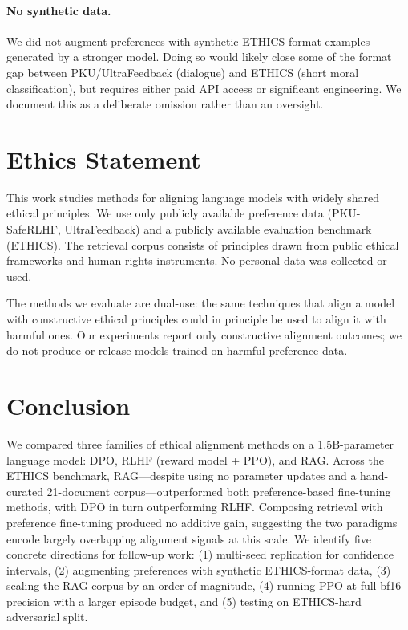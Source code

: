 \paragraph{No synthetic data.} We did not augment preferences with synthetic ETHICS-format examples generated by a stronger model. Doing so would likely close some of the format gap between PKU/UltraFeedback (dialogue) and ETHICS (short moral classification), but requires either paid API access or significant engineering. We document this as a deliberate omission rather than an oversight.

\section{Ethics Statement}
This work studies methods for aligning language models with widely shared ethical principles. We use only publicly available preference data (PKU-SafeRLHF, UltraFeedback) and a publicly available evaluation benchmark (ETHICS). The retrieval corpus consists of principles drawn from public ethical frameworks and human rights instruments. No personal data was collected or used.

The methods we evaluate are dual-use: the same techniques that align a model with constructive ethical principles could in principle be used to align it with harmful ones. Our experiments report only constructive alignment outcomes; we do not produce or release models trained on harmful preference data.

\section{Conclusion}

We compared three families of ethical alignment methods on a 1.5B-parameter language model: DPO, RLHF (reward model + PPO), and RAG. Across the ETHICS benchmark, RAG—despite using no parameter updates and a hand-curated 21-document corpus—outperformed both preference-based fine-tuning methods, with DPO in turn outperforming RLHF. Composing retrieval with preference fine-tuning produced no additive gain, suggesting the two paradigms encode largely overlapping alignment signals at this scale. We identify five concrete directions for follow-up work: (1) multi-seed replication for confidence intervals, (2) augmenting preferences with synthetic ETHICS-format data, (3) scaling the RAG corpus by an order of magnitude, (4) running PPO at full bf16 precision with a larger episode budget, and (5) testing on ETHICS-hard adversarial split.





